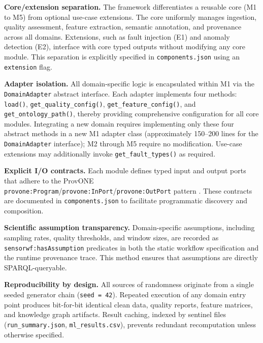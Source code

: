 \documentclass[conference]{IEEEtran}
\newcommand\Alex[1]{\leavevmode{\footnotesize\textbf{\hl{[Alex: #1]}}}}
\begin{document}
\textbf{Core/extension separation.} The framework differentiates a reusable core (M1 to M5) from optional use-case extensions. The core uniformly manages ingestion, quality assessment, feature extraction, semantic annotation, and provenance across all domains. Extensions, such as fault injection (E1) and anomaly detection (E2), interface with core typed outputs without modifying any core module. This separation is explicitly specified in \texttt{components.json} using an \texttt{extension} flag.

\textbf{Adapter isolation.} All domain-specific logic is encapsulated within M1 via the \texttt{DomainAdapter} abstract interface. Each adapter implements four methods: \texttt{load()}, \texttt{get\_quality\_config()}, \texttt{get\_feature\_config()}, and \texttt{get\_ontology\_path()}, thereby providing comprehensive configuration for all core modules. Integrating a new domain requires implementing only these four abstract methods in a new M1 adapter class (approximately 150--200 lines for the \texttt{DomainAdapter} interface); M2 through M5 require no modification. Use-case extensions may additionally invoke \texttt{get\_fault\_types()} as required.

\textbf{Explicit I/O contracts.} Each module defines typed input and output ports that adhere to the ProvONE \texttt{provone:Program}/\texttt{provone:InPort}/\texttt{provone:OutPort} pattern \cite{missier2013provone}. These contracts are documented in \texttt{components.json} to facilitate programmatic discovery and composition. 


\textbf{Scientific assumption transparency.} Domain-specific assumptions, including sampling rates, quality thresholds, and window sizes, are recorded as \texttt{sensorwf:hasAssumption} predicates in both the static workflow specification and the runtime provenance trace. This method ensures that assumptions are directly SPARQL-queryable.

\textbf{Reproducibility by design.} All sources of randomness originate from a single seeded generator chain (\texttt{seed = 42}). Repeated execution of any domain entry point produces bit-for-bit identical clean data, quality reports, feature matrices, and knowledge graph artifacts. Result caching, indexed by sentinel files (\texttt{run\_summary.json}, \texttt{ml\_results.csv}), prevents redundant recomputation unless otherwise specified.
\end{document}
